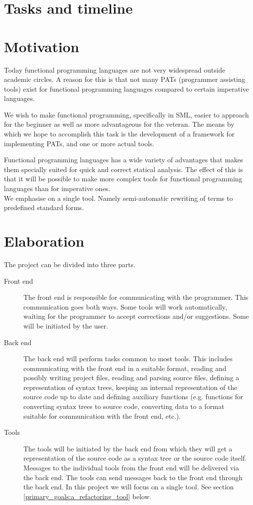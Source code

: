 \documentclass[a4paper,oneside]{article}
\begin{document}
\section{Tasks and timeline}

\section{Motivation}
Today functional programming languages are not very widespread outside academic circles. A reason
for this is that not many PATs (programmer assisting tools) exist for functional programming languages
compared to certain imperative languages.

We wish to make functional programming, specifically in SML, easier to approach for the beginner as
well as more advantageous for the veteran. The means by which we hope to accomplish this task is the
development of a framework for implementing PATs, and one or more actual
tools.

Functional programming languages has a wide variety of advantages that makes them specially suited
for quick and correct statical analysis. The effect of this is that it will be possible to make more
complex tools for functional programming languages than for imperative ones.
\\

We emphasise on a single tool. Namely semi-automatic rewriting of terms to predefined standard
forms. 

\section{Elaboration}
The project can be divided into three parts.
\begin{description}
\item[Front end] The front end is responsible for communicating with the programmer. This
communication goes both ways. Some tools will work automatically, waiting for the programmer to
accept corrections and/or suggestions. Some will be initiated by the user.
\item[Back end] The back end will perform tasks common to most tools. This includes communicating
with the front end in a suitable format, reading and possibly writing project files, reading and
parsing source files, defining a representation of syntax trees, keeping an internal representation
of the source code up to date and defining auxiliary functions (e.g. functions for converting syntax
trees to source code, converting data to a format suitable for communication with the front end,
etc.).
\item[Tools] The tools will be initiated by the back end from which they will get a representation
of the source code as a syntax tree or the source code itself. Messages to the individual tools from
the front end will be delivered via the back end. The tools can send messages back to the front end
through the back end. In this project we will focus on a single tool. See section
\ref{primary_goals:a_refactoring_tool} below.
\end{description}
\end{document}

